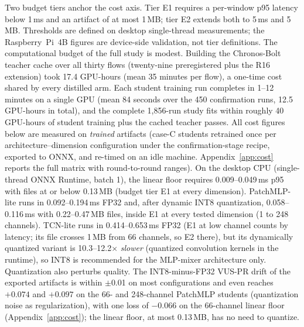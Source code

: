 Two budget tiers anchor the cost axis.
Tier E1 requires a per-window p95 latency below 1\,ms and an
artifact of at most 1\,MB; tier E2 extends both to 5\,ms and
5\,MB.
Thresholds are defined on desktop single-thread measurements; the
Raspberry~Pi~4B figures are device-side validation, not tier
definitions.
The computational budget of the full study is modest.
Building the Chronos-Bolt teacher cache over all thirty flows (twenty-nine
preregistered plus the R16 extension) took 17.4
GPU-hours (mean 35 minutes per flow), a one-time cost shared by every
distilled arm.
Each student training run completes in 1--12 minutes on a single GPU
(mean 84 seconds over the 450 confirmation runs, 12.5 GPU-hours in
total), and the complete 1{,}856-run study fits within roughly 40
GPU-hours of student training plus the cached teacher passes.
All cost figures below are measured on \emph{trained} artifacts
(case-C students retrained once per architecture--dimension
configuration under the confirmation-stage recipe, exported to ONNX,
and re-timed on an idle machine. Appendix~\ref{app:cost} reports the
full matrix with round-to-round ranges). On the desktop CPU
(single-thread ONNX Runtime, batch 1), the
linear floor requires 0.009--0.049\,ms p95 with files at or below
0.13\,MB (budget tier E1 at every dimension). PatchMLP-lite runs in
0.092--0.194\,ms FP32 and, after dynamic INT8 quantization,
0.058--0.116\,ms with 0.22--0.47\,MB files, inside E1 at every tested
dimension (1 to 248 channels). TCN-lite runs in
0.414--0.653\,ms FP32 (E1 at low channel counts by latency; its file
crosses 1\,MB from 66 channels, so E2 there), but its dynamically
quantized variant is 10.3--12.2$\times$ \emph{slower} (quantized
convolution kernels in the runtime), so INT8 is recommended for the
MLP-mixer architecture only. Quantization also perturbs quality. The
INT8-minus-FP32 VUS-PR drift of the exported artifacts is within
$\pm$0.01 on most configurations and even reaches $+0.074$ and $+0.097$
on the 66- and 248-channel PatchMLP students (quantization noise as
regularization), with one loss of $-0.066$ on the 66-channel linear
floor (Appendix~\ref{app:cost}); the linear floor, at most 0.13\,MB,
has no need to quantize.

